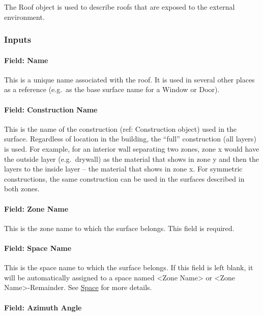 The Roof object is used to describe roofs that are exposed to the external environment.

\subsubsection{Inputs}\label{inputs-8-026}

\paragraph{Field: Name}\label{field-name-4-030}

This is a unique name associated with the roof. It is used in several other places as a reference (e.g.~as the base surface name for a Window or Door).

\paragraph{Field: Construction Name}\label{field-construction-name-4}

This is the name of the construction (ref: Construction object) used in the surface. Regardless of location in the building, the ``full'' construction (all layers) is used. For example, for an interior wall separating two zones, zone x would have the outside layer (e.g.~drywall) as the material that shows in zone y and then the layers to the inside layer -- the material that shows in zone x. For symmetric constructions, the same construction can be used in the surfaces described in both zones.

\paragraph{Field: Zone Name}\label{field-zone-name-4-006}

This is the zone name to which the surface belongs. This field is required.

\paragraph{Field: Space Name}\label{field-space-name-4-006}

This is the space name to which the surface belongs. If this field is left blank, it will be automatically assigned to a space named <Zone Name> or <Zone Name>-Remainder. See \hyperref[space]{Space} for more details.
\paragraph{Field: Azimuth Angle}\label{field-azimuth-angle-4}

